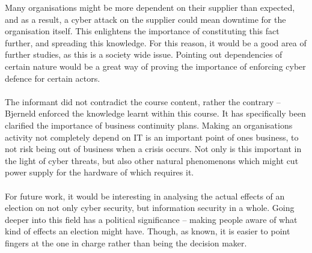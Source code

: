 \documentclass{article}
\begin{document}
Many organisations might be more dependent on their supplier than expected, and as a result, a cyber attack on the supplier could mean downtime for the organisation itself.
This enlightens the importance of constituting this fact further, and spreading this knowledge.
For this reason, it would be a good area of further studies, as this is a society wide issue.
Pointing out dependencies of certain nature would be a great way of proving the importance of enforcing cyber defence for certain actors.
\\
\\
The informant did not contradict the course content, rather the contrary -- Bjerneld enforced the knowledge learnt within this course.
It has specifically been clarified the importance of business continuity plans.
Making an organisations activity not completely depend on IT is an important point of ones business, to not risk being out of business when a crisis occurs.
Not only is this important in the light of cyber threats, but also other natural phenomenons which might cut power supply for the hardware of which requires it.
\\
\\
For future work, it would be interesting in analysing the actual effects of an election on not only cyber security, but information security in a whole.
Going deeper into this field has a political significance -- making people aware of what kind of effects an election might have.
Though, as known, it is easier to point fingers at the one in charge rather than being the decision maker.

\printbibliography

\newpage
\end{document}
